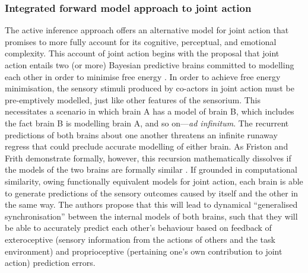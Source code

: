 \begin{CJK}{UTF8}{gbsn}
\subsubsection{Integrated forward model approach to joint action\label{sect:IFMjointAction}}
The active inference approach offers an alternative model for joint action that promises to more fully account for its cognitive, perceptual, and emotional complexity.  This account of joint action begins with the proposal that joint action entails two (or more) Bayesian predictive brains committed to modelling each other in order to minimise free energy \citep{Friston2015,Friston2015a}. In order to achieve free energy minimisation, the sensory stimuli produced by co-actors in joint action must be pre-emptively modelled, just like other features of the sensorium.  This necessitates a scenario in which brain A has a model of brain B, which includes the fact brain B is modelling brain A, and so on---\textit{ad infinitum}.  The recurrent predictions of both brains about one another threatens an infinite runaway regress that could preclude accurate modelling of either brain.  As Friston and Frith demonstrate formally, however, this recursion mathematically dissolves if the models of the two brains are formally similar \citep{Friston2015}.  If grounded in computational similarity, owing functionally equivalent models for joint action, each brain is able to generate predictions of the sensory outcomes caused by itself and the other in the same way.  The authors propose that this will lead to dynamical ``generalised synchronisation'' \citep{Barreto2003} between the internal models of both brains, such that they will be able to accurately predict each other's behaviour based on feedback of exteroceptive (sensory information from the actions of others and the task environment) and proprioceptive (pertaining one's own contribution to joint action) prediction errors.


\end{CJK}
